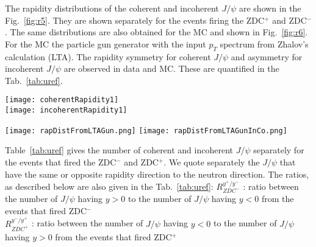     The rapidity distributions of the coherent and incoherent $J/\psi$ are shown in
      the Fig.~\ref{fig:r5}. 
    They are shown separately for the events firing the ZDC$^{+}$ and ZDC$^{-}$. 
    The same distributions are also obtained for the MC and shown in 
      Fig.~\ref{fig:r6}. 
    For the MC the particle gun generator with the input $p_{T}$ spectrum from 
      Zhalov's  calculation (LTA). 
    The rapidity symmetry for coherent $J/\psi$ and asymmetry for incoherent 
      $J/\psi$ are observed in data and MC. 
    These are quantified in the Tab.~\ref{tab:uref}. 
    
    \begin{figure*}[!Hhtb]
      \begin{center}
        \texttt{[image: coherentRapidity1]}\\
            \texttt{[image: incoherentRapidity1]}
    
    
                 \caption{
        \label{fig:r5}  
        The rapidity distribution of the coherent (top) and incoherent (bottom) $J/\psi$ for the  ZDC$^{+}$ and ZDC$^{-}$. 
            }
           \end{center}
    \end{figure*}
    
    \begin{figure*}[!Hhtb]
      \begin{center}
        \texttt{[image: rapDistFromLTAGun.png]}
            \texttt{[image: rapDistFromLTAGunInCo.png]}
    
    
                 \caption{
        \label{fig:r6}  
        The rapidity distribution of the coherent (left) and incoherent (right) $J/\psi$ for the  ZDC$^{+}$ and ZDC$^{-}$ from MC (particle gun with customized $J/\psi p_{T}$ input distribution). 
            }
           \end{center}
    \end{figure*}
    
    Table~\ref{tab:uref} gives the number of coherent and incoherent $J/\psi$ 
      separately for the events that fired the ZDC$^{-}$ and ZDC$^{+}$. 
    We quote separately the $J/\psi$ that have the same or opposite rapidity 
      direction to the neutron direction. 
    The ratios, as described below are also given in the Tab.~\ref{tab:uref}: 
      $R_{ZDC^{-}}^{y^{+}/y^{-}}$ : ratio between the number of $J/\psi$ having 
        $y>0$ to the number of $J/\psi$ having $y<0$ from the events that fired 
        ZDC$^{-}$\\
      $R_{ZDC^{+}}^{y^{-}/y^{+}}$ : ratio between the number of $J/\psi$ having 
        $y<0$ to the number of $J/\psi$ having $y>0$ from the events that fired 
        ZDC$^{+}$\\
    
